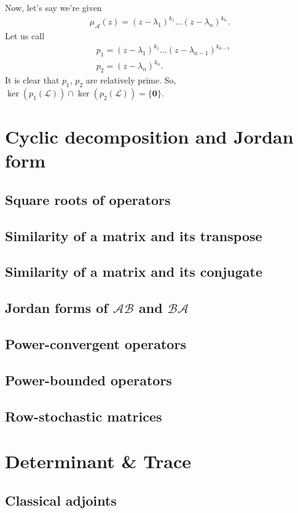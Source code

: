 \documentclass{article}
\theoremstyle{definition}
\newcommand{\A}{\mathcal{A}}
\newcommand{\lag}{\mathcal{L}}
\begin{document}
Now, let's say we're given 
\begin{align*}
\mu_\A(z) = (z-\lambda_1)^{k_1} \dots (z - \lambda_n)^{k_n}.
\end{align*}
Let us call
\begin{align*}
&p_1 = (z-\lambda_1)^{k_1} \dots (z - \lambda_{n-1})^{k_{n-1}}\\
&p_2 = (z - \lambda_n)^{k_n}.
\end{align*}
It is clear that $p_1$, $p_2$ are relatively prime. So, $\ker(p_1(\lag)) \cap \ker(p_2(\lag)) = \{ \mathbf{0} \}$. 






\newpage 
\section{Cyclic decomposition and Jordan form}
\subsection{Square roots of operators}
\subsection{Similarity of a matrix and its transpose}
\subsection{Similarity of a matrix and its conjugate}
\subsection{Jordan forms of $\mathcal{AB}$ and $\mathcal{BA}$}
\subsection{Power-convergent operators}
\subsection{Power-bounded operators}
\subsection{Row-stochastic matrices}
\newpage 
\section{Determinant \& Trace}
\subsection{Classical adjoints}
\end{document}
